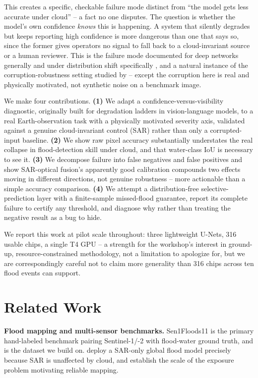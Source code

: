 \documentclass{article}
\begin{document}
This creates a specific, checkable failure mode distinct from ``the model gets less accurate under cloud'' -- a fact no one disputes. The question is whether the model's own confidence \emph{knows} this is happening. A system that silently degrades but keeps reporting high confidence is more dangerous than one that says so, since the former gives operators no signal to fall back to a cloud-invariant source or a human reviewer. This is the failure mode documented for deep networks generally \citep{guo2017calibration} and under distribution shift specifically \citep{ovadia2019trust}, and a natural instance of the corruption-robustness setting studied by \citet{hendrycks2019benchmarking} -- except the corruption here is real and physically motivated, not synthetic noise on a benchmark image.

We make four contributions. \textbf{(1)} We adapt a confidence-versus-visibility diagnostic, originally built for degradation ladders in vision-language models, to a real Earth-observation task with a physically motivated severity axis, validated against a genuine cloud-invariant control (SAR) rather than only a corrupted-input baseline. \textbf{(2)} We show raw pixel accuracy substantially understates the real collapse in flood-detection skill under cloud, and that water-class IoU is necessary to see it. \textbf{(3)} We decompose failure into false negatives and false positives and show SAR-optical fusion's apparently good calibration compounds two effects moving in different directions, not genuine robustness -- more actionable than a simple accuracy comparison. \textbf{(4)} We attempt a distribution-free selective-prediction layer with a finite-sample missed-flood guarantee, report its complete failure to certify any threshold, and diagnose why rather than treating the negative result as a bug to hide.

We report this work at pilot scale throughout: three lightweight U-Nets, 316 usable chips, a single T4 GPU -- a strength for the workshop's interest in ground-up, resource-constrained methodology, not a limitation to apologize for, but we are correspondingly careful not to claim more generality than 316 chips across ten flood events can support.

\section{Related Work}
\label{sec:related}

\textbf{Flood mapping and multi-sensor benchmarks.} Sen1Floods11 \citep{bonafilia2020sen1floods11} is the primary hand-labeled benchmark pairing Sentinel-1/-2 with flood-water ground truth, and is the dataset we build on. \citet{misra2025mapping} deploy a SAR-only global flood model precisely because SAR is unaffected by cloud, and \citet{tellman2021satellite} establish the scale of the exposure problem motivating reliable mapping.
\end{document}
